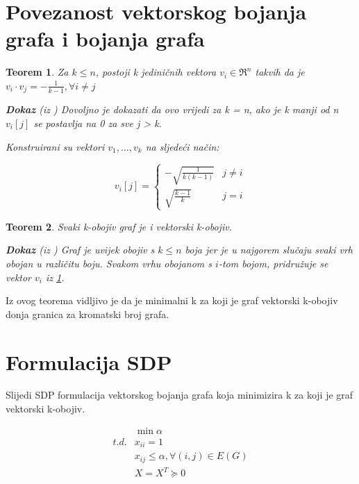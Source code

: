\documentclass[diplomskirad]{fer}
\newtheorem{theorem}{Teorem}[chapter]
\begin{document}
\section{Povezanost vektorskog bojanja grafa i bojanja grafa}
\begin{theorem}\label{teorem1}
  Za $k \leq n$, postoji k jediničnih vektora $v_i \in \Re^n$ takvih da je $v_i \cdot v_j = -\frac{1}{k-1}, \forall i \neq j$ 

  \textbf{Dokaz} (iz \cite{karger1998approximategraphcoloringsemidefinite}) Dovoljno je dokazati da ovo vrijedi za k = n, ako je k manji od n
  $v_{i}[j]$ se postavlja na 0 za sve j > k.

  Konstruirani su vektori $v_1, \dots, v_k$ na sljedeći način:

  \begin{equation}
    v_i[j] = \begin{cases} -\sqrt{\frac{1}{k(k-1)}} & j \neq i \\ \sqrt{\frac{k-1}{k}} & j = i \end{cases}
  \end{equation}
\end{theorem}

\begin{theorem}
  Svaki k-obojiv graf je i vektorski k-obojiv.

  \textbf{Dokaz} (iz \cite{karger1998approximategraphcoloringsemidefinite}) Graf je uvijek obojiv s $k \leq n$ boja jer je u najgorem slučaju
  svaki vrh obojan u različitu boju. Svakom vrhu obojanom s $i$-tom bojom, pridružuje se vektor $v_i$ iz \ref{teorem1}.
\end{theorem}

Iz ovog teorema vidljivo je da je minimalni k za koji je graf vektorski k-obojiv donja granica za kromatski broj grafa.

\section{Formulacija SDP}
Slijedi SDP formulacija vektorskog bojanja grafa koja minimizira k za koji je graf vektorski k-obojiv.

\begin{equation}
  \begin{split}
    & \min \alpha \\
    t.d. & x_{ii} = 1 \\
         & x_{ij} \leq \alpha, \forall (i,j) \in E(G) \\
         & X=X^T \succeq 0 
  \end{split}
\end{equation}
\end{document}
